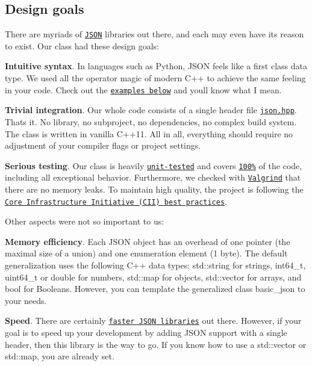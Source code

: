 \subsection*{Design goals}

There are myriads of \href{http://json.org}{\tt J\+S\+ON} libraries out there, and each may even have its reason to exist. Our class had these design goals\+:


\begin{DoxyItemize}
\item {\bfseries Intuitive syntax}. In languages such as Python, J\+S\+ON feels like a first class data type. We used all the operator magic of modern C++ to achieve the same feeling in your code. Check out the \href{#examples}{\tt examples below} and you\textquotesingle{}ll know what I mean.
\item {\bfseries Trivial integration}. Our whole code consists of a single header file \href{https://github.com/nlohmann/json/blob/develop/src/json.hpp}{\tt {\ttfamily json.\+hpp}}. That\textquotesingle{}s it. No library, no subproject, no dependencies, no complex build system. The class is written in vanilla C++11. All in all, everything should require no adjustment of your compiler flags or project settings.
\item {\bfseries Serious testing}. Our class is heavily \href{https://github.com/nlohmann/json/blob/master/test/src/unit.cpp}{\tt unit-\/tested} and covers \href{https://coveralls.io/r/nlohmann/json}{\tt 100\%} of the code, including all exceptional behavior. Furthermore, we checked with \href{http://valgrind.org}{\tt Valgrind} that there are no memory leaks. To maintain high quality, the project is following the \href{https://bestpractices.coreinfrastructure.org/projects/289}{\tt Core Infrastructure Initiative (C\+II) best practices}.
\end{DoxyItemize}

Other aspects were not so important to us\+:


\begin{DoxyItemize}
\item {\bfseries Memory efficiency}. Each J\+S\+ON object has an overhead of one pointer (the maximal size of a union) and one enumeration element (1 byte). The default generalization uses the following C++ data types\+: {\ttfamily std\+::string} for strings, {\ttfamily int64\+\_\+t}, {\ttfamily uint64\+\_\+t} or {\ttfamily double} for numbers, {\ttfamily std\+::map} for objects, {\ttfamily std\+::vector} for arrays, and {\ttfamily bool} for Booleans. However, you can template the generalized class {\ttfamily basic\+\_\+json} to your needs.
\item {\bfseries Speed}. There are certainly \href{https://github.com/miloyip/nativejson-benchmark#parsing-time}{\tt faster J\+S\+ON libraries} out there. However, if your goal is to speed up your development by adding J\+S\+ON support with a single header, then this library is the way to go. If you know how to use a {\ttfamily std\+::vector} or {\ttfamily std\+::map}, you are already set.
\end{DoxyItemize}

